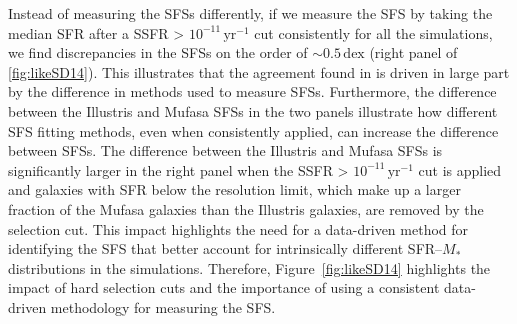 \documentclass[tighten, preprint]{aastex62}
\begin{document}
Instead of measuring the SFSs differently, if we measure the SFS by taking the
median SFR after a SSFR > $10^{-11}\, \mathrm{yr}^{-1}$ cut consistently for all the  
simulations, we find discrepancies in the SFSs on the order of ${\sim}0.5\,\mathrm{dex}$
(right panel of \ref{fig:likeSD14}). This illustrates that the agreement found in 
\cite{somerville2015} is driven in large part by the difference in methods used to 
measure SFSs. Furthermore, the difference between the Illustris and {\sc Mufasa} SFSs in 
the two panels illustrate how different SFS fitting methods, even when 
consistently applied, can increase the difference between SFSs. The difference 
between the Illustris and {\sc Mufasa} SFSs is significantly larger in the 
right panel when the SSFR > $10^{-11}\, \mathrm{yr}^{-1}$ cut is applied and 
galaxies with SFR below the resolution limit, which make up a larger fraction of the {\sc Mufasa} 
galaxies than the Illustris galaxies, are removed by the selection cut. 
This impact highlights the need for a data-driven method for identifying the 
SFS that better account for intrinsically different SFR--$M_*$ distributions 
in the simulations. Therefore, Figure~\ref{fig:likeSD14} highlights the impact 
of hard selection cuts and the importance of using a consistent data-driven 
methodology for measuring the SFS. 

\end{document}
